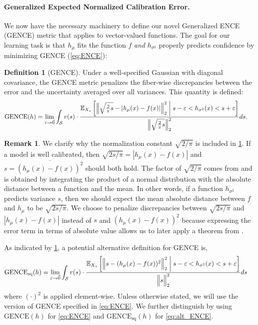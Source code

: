 \documentclass[10pt]{article} %
\theoremstyle{definition}
\newtheorem{rmk}{Remark}
\newtheorem{defn}{Definition}
\newcommand{\GENCE}{\mathrm{GENCE}(h)}
\newcommand{\GENCESQ}{\mathrm{GENCE}_{\mathrm{sq}}(h)}
\begin{document}
\paragraph{Generalized Expected Normalized Calibration Error.} We now have the necessary machinery to define our novel Generalized ENCE (GENCE) metric that applies to vector-valued functions. The goal for our learning task is that $h_\mu$ fits the function $f$ \textit{and} $h_{\sigma^2}$ properly predicts confidence by minimizing GENCE (\cref{eq:ENCE}):
\begin{defn}[GENCE] \label{def:GENCE} Under a well-specified Gaussian with diagonal covariance, the GENCE metric penalizes the fiber-wise discrepancies between the error and the uncertainty averaged over all variances. This quantity is defined:
\begin{align}
    &\GENCE = \underset{\varepsilon \to \vec{0}}{\lim}\int_{\mathcal{S}}  r(s)  \cdot \frac{\mathbb{E}_{X_s}\left[\Bigl\lVert \sqrt{\frac{2}{\pi}s} - | h_{\mu}(x) - f(x)| \Bigr\rVert _2^2 \biggm| s - \varepsilon <h_{\sigma^2}(x) < s + \varepsilon \right]  }{\Bigl \lVert \sqrt{\frac{2}{\pi}s} \Bigr \rVert_2^2} d s. \label{eq:ENCE}
\end{align}
\end{defn}

\begin{rmk} \label{rmk:clarify_factor} We clarify why the normalization constant $\sqrt{2/\pi}$ is included in \cref{def:GENCE}. If a model is well calibrated, then $\sqrt{2s/\pi} = \overline{|h_\mu(x) - f(x)|}$ and $s = \overline{(h_\mu(x) - f(x))^2}$ should both hold. The factor of $\sqrt{2/\pi}$ comes from \cite{geary1935ratio} and is obtained by integrating the product of a normal distribution with the absolute distance between a function and the mean. In other words, if a function $h_{\sigma^2}$ predicts variance $s$, then we should expect the mean absolute distance between $f$ and $h_\mu$ to be $\sqrt{2s/\pi}$. We choose to penalize discrepancies between $\sqrt{2s/\pi}$ and $|h_\mu(x) - f(x)|$ instead of $s$ and $(h_\mu(x) - f(x))^2$ because expressing the error term in terms of absolute value allows us to later apply a theorem from \cite{wang2024general}. 
\end{rmk}

As indicated by \cref{rmk:clarify_factor}, a potential alternative definition for GENCE is,
%
\begin{align}
    &\GENCESQ = \underset{\varepsilon \to \vec{0}}{\lim}\int_{\mathcal{S}}  r(s)  \cdot \frac{\mathbb{E}_{X_s}\left[\Bigl\lVert s - (h_{\mu}(x) - f(x))^2 \Bigr\rVert _2^2 \biggm| s - \varepsilon <h_{\sigma^2}(x) < s + \varepsilon \right]  }{\Bigl \lVert s \Bigr \rVert_2^2} ds \label{eq:alt_ENCE}
\end{align}
%
where $(\cdot)^2$ is applied element-wise. Unless otherwise stated, we will use the version of GENCE specified in \cref{eq:ENCE}. We further distinguish by using $\GENCE$ for \cref{eq:ENCE} and $\GENCESQ$ for \cref{eq:alt_ENCE}.
\end{document}
